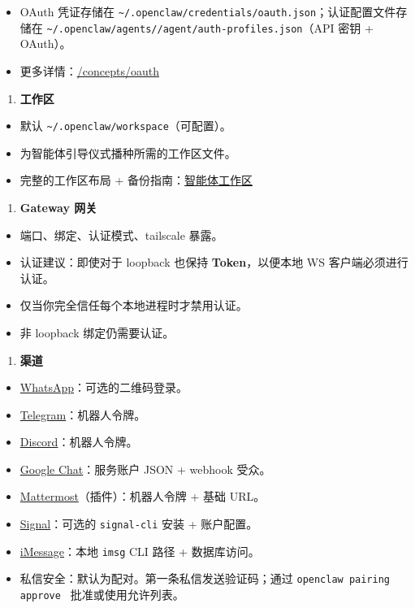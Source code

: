 \begin{itemize}
  \item OAuth 凭证存储在 \texttt{\textasciitilde{}/.openclaw/credentials/oauth.json}；认证配置文件存储在 \texttt{\textasciitilde{}/.openclaw/agents//agent/auth-profiles.json}（API 密钥 + OAuth）。
  \item 更多详情：\href{/concepts/oauth}{/concepts/oauth}
\end{itemize}


\begin{enumerate}
  \item \textbf{工作区}
\end{enumerate}

\begin{itemize}
  \item 默认 \texttt{\textasciitilde{}/.openclaw/workspace}（可配置）。
  \item 为智能体引导仪式播种所需的工作区文件。
  \item 完整的工作区布局 + 备份指南：\href{/concepts/agent-workspace}{智能体工作区}
\end{itemize}


\begin{enumerate}
  \item \textbf{Gateway 网关}
\end{enumerate}

\begin{itemize}
  \item 端口、绑定、认证模式、tailscale 暴露。
  \item 认证建议：即使对于 loopback 也保持 \textbf{Token}，以便本地 WS 客户端必须进行认证。
  \item 仅当你完全信任每个本地进程时才禁用认证。
  \item 非 loopback 绑定仍需要认证。
\end{itemize}


\begin{enumerate}
  \item \textbf{渠道}
\end{enumerate}

\begin{itemize}
  \item \href{/channels/whatsapp}{WhatsApp}：可选的二维码登录。
  \item \href{/channels/telegram}{Telegram}：机器人令牌。
  \item \href{/channels/discord}{Discord}：机器人令牌。
  \item \href{/channels/googlechat}{Google Chat}：服务账户 JSON + webhook 受众。
  \item \href{/channels/mattermost}{Mattermost}（插件）：机器人令牌 + 基础 URL。
  \item \href{/channels/signal}{Signal}：可选的 \texttt{signal-cli} 安装 + 账户配置。
  \item \href{/channels/imessage}{iMessage}：本地 \texttt{imsg} CLI 路径 + 数据库访问。
  \item 私信安全：默认为配对。第一条私信发送验证码；通过 \texttt{openclaw pairing approve  } 批准或使用允许列表。
\end{itemize}


